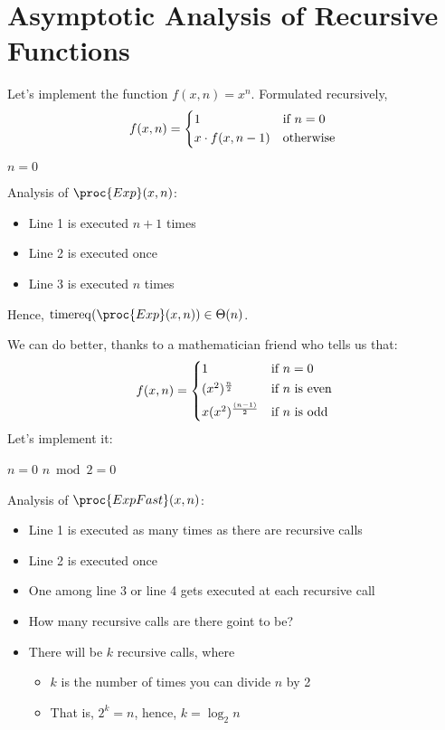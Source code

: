 \documentclass[a4paper]{report}
\theoremstyle{definition}
\DeclareMathOperator*{\treq}{timereq}
\begin{document}
\section{Asymptotic Analysis of Recursive Functions}
Let's implement the function $f(x,n) = x^n$. Formulated recursively,
\begin{align*}
f(x,n) = 
\begin{cases*}
1 & if $n = 0$\\
x \cdot f(x,n-1) & otherwise
\end{cases*}
\end{align*}

\begin{codebox}
\li \If $n = 0$ 
\li \Then {}
\End
\li {}
\end{codebox}


Analysis of $\proc{Exp}(x,n)$:
\begin{itemize}
\item Line 1 is executed $n+1$ times
\item Line 2 is executed once
\item Line 3 is executed $n$ times
\end{itemize}

Hence, $\treq(\proc{Exp}(x,n)) \in \Theta(n)$.

We can do better, thanks to a mathematician friend who tells us that:
%
\begin{align*}
f(x,n) = 
\begin{cases*}
1 & if $n = 0$\\
(x^2)^{\frac{n}{2}} & if $n$ is even\\
x (x^2)^{\frac{(n-1)}{2}} & if $n$ is odd\\
\end{cases*}
\end{align*}
%
Let's implement it:

\begin{codebox}
\li \If $n = 0$ 
\li \Then {}
\End
\li \If $n \bmod 2 = 0$
\li \Then {}
\End
\li {}
\end{codebox}

Analysis of $\proc{ExpFast}(x,n)$:
\begin{itemize}
\item Line 1 is executed as many times as there are recursive calls
\item Line 2 is executed once
\item One among line 3 or line 4 gets executed at each recursive call
\item How many recursive calls are there goint to be?
\item There will be $k$ recursive calls, where
\begin{itemize}
\item $k$ is the number of times you can divide $n$ by 2
\item That is, $2^k = n$, hence, $k = \log_2 n$
\end{itemize}
\end{itemize}
\end{document}

